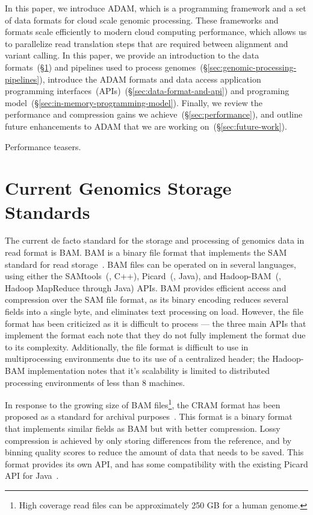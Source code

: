 \documentclass[10pt,twocolumn]{article}
\begin{document}
In this paper, we introduce ADAM, which is a programming framework and a set of data formats for cloud scale genomic
processing. These frameworks and formats scale efficiently to modern cloud computing performance, which allows us to
parallelize read translation steps that are required between alignment and variant calling. In this paper, we provide an
introduction to the data formats~(\S\ref{sec:current-genomics-storage-standards}) and pipelines used to process
genomes~(\S\ref{sec:genomic-processing-pipelines}), introduce the ADAM formats and data access
application programming interfaces~(APIs)~(\S\ref{sec:data-format-and-api}) and programing
model~(\S\ref{sec:in-memory-programming-model}). Finally, we review the performance and compression gains we
achieve~(\S\ref{sec:performance}), and outline future enhancements to ADAM that we are working on~(\S\ref{sec:future-work}).

Performance teasers.

\section{Current Genomics Storage Standards}
\label{sec:current-genomics-storage-standards}

The current de facto standard for the storage and processing of genomics data in read format is BAM. BAM is a binary file
format that implements the SAM standard for read storage~\cite{li09}. BAM files can be operated on in several languages,
using either the SAMtools~(\cite{li09}, C++), Picard~(\cite{picard}, Java), and Hadoop-BAM~(\cite{niemenmaa12}, Hadoop
MapReduce through Java) APIs. BAM provides efficient access and compression over the SAM file format, as its binary
encoding reduces several fields into a single byte, and eliminates text processing on load. However, the file format has been
criticized as it is difficult to process --- the three main APIs that implement the format each note that they do not fully implement
the format due to its complexity. Additionally, the file format is difficult to use in multiprocessing environments due to its use
of a centralized header; the Hadoop-BAM implementation notes that it's scalability is limited to distributed processing
environments of less than 8 machines.

In response to the growing size of BAM files\footnote{High coverage read files can be approximately 250 GB for a human genome.},
the CRAM format has been proposed as a standard for archival purposes~\cite{fritz11}. This format is a binary format that implements
similar fields as BAM but with better compression. Lossy compression is achieved by only storing differences from the reference, and
by binning quality scores to reduce the amount of data that needs to be saved. This format provides its own API, and has some
compatibility with the existing Picard API for Java~\cite{picard}.
\end{document}
